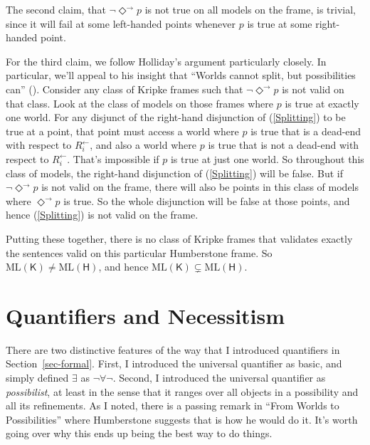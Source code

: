 \documentclass[
  11pt,
  letterpaper,
  DIV=11,
  numbers=noendperiod,
  twoside]{scrartcl}
\begin{document}
The second claim, that \(\neg \Diamond^{\rightarrow} p\) is not true on
all models on the frame, is trivial, since it will fail at some
left-handed points whenever \(p\) is true at some right-handed point.

For the third claim, we follow Holliday's argument particularly closely.
In particular, we'll appeal to his insight that ``Worlds cannot split,
but possibilities can'' (). Consider any class of Kripke frames such that
\(\neg \Diamond^{\rightarrow} p\) is not valid on that class. Look at
the class of models on those frames where \(p\) is true at exactly one
world. For any disjunct of the right-hand disjunction of
(\ref{Splitting}) to be true at a point, that point must access a world
where \(p\) is true that is a dead-end with respect to
\(R^{\leftarrow}_i\), and also a world where \(p\) is true that is not a
dead-end with respect to \(R^{\leftarrow}_i\). That's impossible if
\(p\) is true at just one world. So throughout this class of models, the
right-hand disjunction of (\ref{Splitting}) will be false. But if
\(\neg \Diamond^{\rightarrow} p\) is not valid on the frame, there will
also be points in this class of models where
\(\Diamond^{\rightarrow} p\) is true. So the whole disjunction will be
false at those points, and hence (\ref{Splitting}) is not valid on the
frame.

Putting these together, there is no class of Kripke frames that
validates exactly the sentences valid on this particular Humberstone
frame. So \(\mathrm{ML}(\mathsf{K}) \neq \mathrm{ML}(\mathsf{H})\), and
hence \(\mathrm{ML}(\mathsf{K}) \subsetneq \mathrm{ML}(\mathsf{H})\).

\section{Quantifiers and Necessitism}\label{sec-quant}

There are two distinctive features of the way that I introduced
quantifiers in Section~\ref{sec-formal}. First, I introduced the
universal quantifier as basic, and simply defined \(\exists\) as
\(\neg \forall \neg\). Second, I introduced the universal quantifier as
\emph{possibilist}, at least in the sense that it ranges over all
objects in a possibility and all its refinements. As I noted, there is a
passing remark in ``From Worlds to Possibilities'' where Humberstone
suggests that is how he would do it. It's worth going over why this ends
up being the best way to do things.
\end{document}
